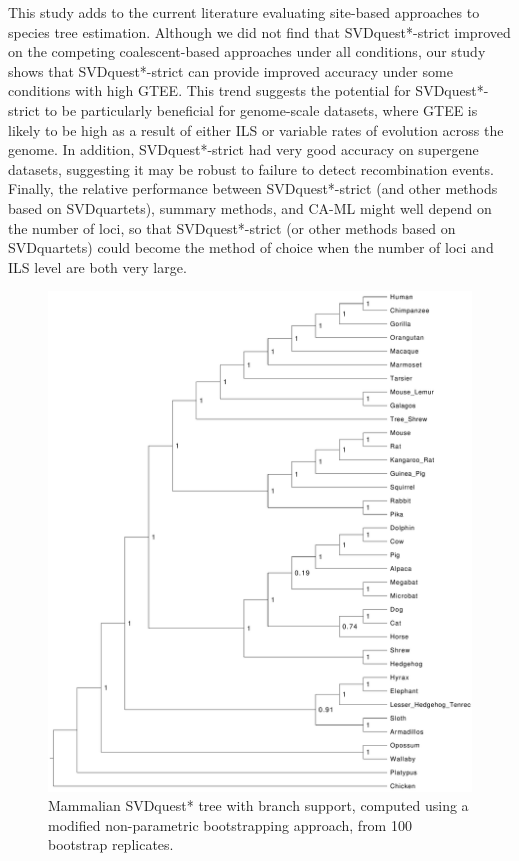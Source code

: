 This study adds to the current literature evaluating site-based approaches to species tree estimation.
Although we did not find that SVDquest*-strict improved on the competing coalescent-based approaches under all conditions,
our study shows that SVDquest*-strict can provide improved accuracy under  some conditions with high GTEE.
This trend suggests the potential for
SVDquest*-strict to be particularly beneficial for genome-scale datasets,  where GTEE is likely to be high as a result of
either ILS or variable rates of evolution across the genome. 
In addition, SVDquest*-strict had very good accuracy on supergene datasets, suggesting it may be robust to failure to detect recombination events.
Finally, the relative performance between SVDquest*-strict (and other methods based
on SVDquartets),  summary methods, and CA-ML might well depend on the number of
loci, so that SVDquest*-strict (or other methods based on SVDquartets) could become the method of choice when the number of loci and ILS level are both very large.
 

\begin{figure}
  \centering
  \includegraphics[width=\textwidth]{svdquest-figs/fully-parametric-mammalian.pdf}
  \caption{Mammalian SVDquest* tree with branch support, computed using a modified non-parametric bootstrapping approach, from 100 bootstrap replicates.}
  \label{svdquest::fig:mammalian-svdquestplus}
\end{figure}
